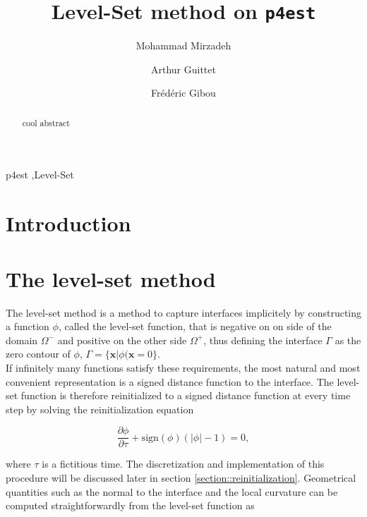 \documentclass{elsarticle}
\newcommand{\pd}[2]{\frac{\partial #1}{\partial #2}}
\begin{document}
\begin{frontmatter}
\title{Level-Set method on \texttt{p4est}}


\address[MECHE]{Department of Mechanical Engineering, University of California, Santa Barbara, CA 93106-5070}
\address[CS]{Department of Computer Science, University of California, Santa Barbara, CA 93106-5110}

 \author[MECHE]{Mohammad Mirzadeh} \author[MECHE]{Arthur Guittet} \author[MECHE,CS]{Fr\'ed\'eric Gibou}

\begin{abstract}
cool abstract
\end{abstract}
\begin{keyword}
p4est \sep Level-Set
\end{keyword}

\end{frontmatter}

\section{Introduction}

\section{The level-set method}

\indent The level-set method is a method to capture interfaces implicitely by constructing a function $\phi$, called the level-set function, that is negative on on side of the domain $\Omega^-$ and positive on the other side $\Omega^+$, thus defining the interface $\Gamma$ as the zero contour of $\phi$, $\Gamma = \{\mathbf{x} \vert \phi(\mathbf{x}=0\}$.\\

If infinitely many functions satisfy these requirements, the most natural and most convenient representation is a signed distance function to the interface. The level-set function is therefore reinitialized to a signed distance function at every time step by solving the reinitialization equation

\begin{equation} \label{eq::reinitialization}
\pd{\phi}{\tau} + \mathrm{sign}(\phi) \left( \lvert \phi \rvert - 1 \right) = 0,
\end{equation}

where $\tau$ is a fictitious time. The discretization and implementation of this procedure will be discussed later in section \ref{section::reinitialization}. Geometrical quantities such as the normal to the interface and the local curvature can be computed straightforwardly from the level-set function as
\end{document}
